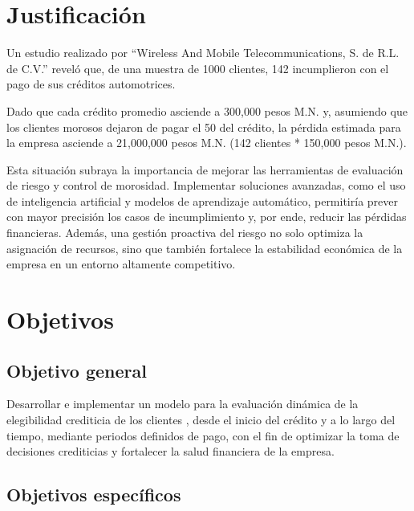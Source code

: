 \section{Justificación}

Un estudio realizado por “Wireless And Mobile Telecommunications, S. de R.L. de C.V.” 
reveló que, de una muestra de 1000 clientes, 142 incumplieron con 
el pago de sus créditos automotrices. \medskip

Dado que cada crédito promedio asciende a 300,000 pesos M.N. y, 
asumiendo que los clientes morosos dejaron de pagar el 50%
del crédito, la pérdida estimada para la empresa
asciende a 21,000,000 pesos M.N. (142 clientes * 150,000 pesos M.N.). \medskip

Esta situación subraya la importancia de mejorar las
herramientas de evaluación de riesgo y control de morosidad.
Implementar soluciones avanzadas, como el uso de inteligencia artificial y modelos de aprendizaje automático, 
permitiría prever con mayor precisión los casos de incumplimiento 
y, por ende, reducir las pérdidas financieras. Además, una gestión proactiva del riesgo no solo optimiza la asignación de recursos, sino que también fortalece la estabilidad económica de la empresa en un entorno altamente competitivo.

\section{Objetivos}

\subsection{Objetivo general}

Desarrollar e implementar un modelo para la evaluación dinámica de la elegibilidad crediticia 
de los clientes , desde el inicio del crédito y a lo largo del tiempo, mediante periodos 
definidos de pago, con el fin de optimizar la toma de decisiones crediticias y fortalecer 
la salud financiera de la empresa.

\subsection{Objetivos específicos}

